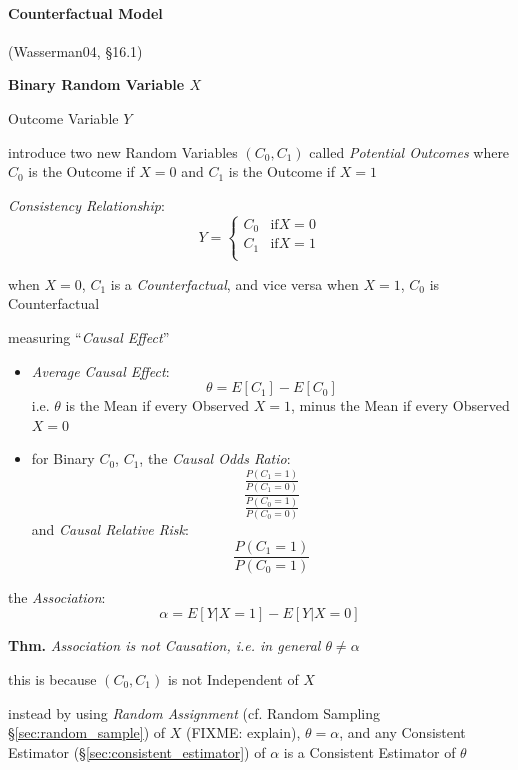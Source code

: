 


\paragraph{Counterfactual Model}\label{sec:counterfactual}\hfill

(Wasserman04, \S16.1)

\textbf{Binary Random Variable $X$}

Outcome Variable $Y$

introduce two new Random Variables $(C_0, C_1)$ called \emph{Potential Outcomes}
where $C_0$ is the Outcome if $X = 0$ and $C_1$ is the Outcome if $X = 1$

\emph{Consistency Relationship}:
\[
  Y = \begin{cases}
    C_0 & \text{if} X = 0 \\
    C_1 & \text{if} X = 1 \\
  \end{cases}
\]

when $X = 0$, $C_1$ is a \emph{Counterfactual}, and vice versa when $X = 1$,
$C_0$ is Counterfactual

measuring ``\emph{Causal Effect}''

\begin{itemize}
  \item \emph{Average Causal Effect}:
    \[
      \theta = E[C_1] - E[C_0]
    \]
    i.e. $\theta$ is the Mean if every Observed $X = 1$, minus the Mean if every
    Observed $X = 0$

  \item for Binary $C_0$, $C_1$, the \emph{Causal Odds Ratio}:
    \[
      \frac{
        \frac{P(C_1 = 1)}{P(C_1 = 0)}
      }{
        \frac{P(C_0 = 1)}{P(C_0 = 0)}
      }
    \]
    and \emph{Causal Relative Risk}:
    \[
      \frac{P(C_1 = 1)}{P(C_0 = 1)}
    \]
\end{itemize}

the \emph{Association}:
\[
  \alpha = E[Y | X = 1] - E[Y | X = 0]
\]

\textbf{Thm.} \emph{Association is not Causation, i.e. in general
$\theta \neq \alpha$}

this is because $(C_0, C_1)$ is not Independent of $X$

instead by using \emph{Random Assignment} (cf. Random Sampling
\S\ref{sec:random_sample}) of $X$ (FIXME: explain), $\theta = \alpha$, and any
Consistent Estimator (\S\ref{sec:consistent_estimator}) of $\alpha$ is a
Consistent Estimator of $\theta$


